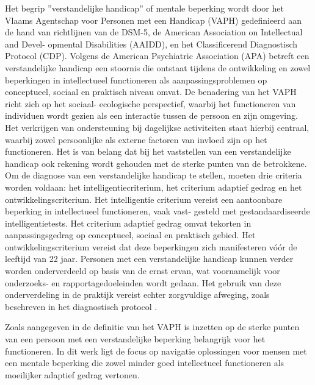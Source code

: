 Het begrip ”verstandelijke handicap” of mentale beperking wordt door het Vlaams Agentschap voor Personen met een Handicap (VAPH) gedefinieerd aan de hand van richtlijnen van de DSM-5, de American Association on Intellectual and Devel- opmental Disabilities (AAIDD), en het Classificerend Diagnostisch Protocol (CDP). Volgens de American Psychiatric Association (APA) betreft een verstandelijke handicap een stoornis die ontstaat tijdens de ontwikkeling en zowel beperkingen in intellectueel functioneren als aanpassingsproblemen op conceptueel, sociaal en praktisch niveau omvat. De benadering van het VAPH richt zich op het sociaal- ecologische perspectief, waarbij het functioneren van individuen wordt gezien als een interactie tussen de persoon en zijn omgeving. Het verkrijgen van ondersteuning bij dagelijkse activiteiten staat hierbij centraal, waarbij zowel persoonlijke als externe factoren van invloed zijn op het functioneren. Het is van belang dat bij het vaststellen van een verstandelijke handicap ook rekening wordt gehouden met de sterke punten van de betrokkene. Om de diagnose van een verstandelijke handicap te stellen, moeten drie criteria worden voldaan: het intelligentiecriterium, het criterium adaptief gedrag en het ontwikkelingscriterium. Het intelligentie criterium vereist een aantoonbare beperking in intellectueel functioneren, vaak vast- gesteld met gestandaardiseerde intelligentietests. Het criterium adaptief gedrag omvat tekorten in aanpassingsgedrag op conceptueel, sociaal en praktisch gebied. Het ontwikkelingscriterium vereist dat deze beperkingen zich manifesteren vóór de leeftijd van 22 jaar. Personen met een verstandelijke handicap kunnen verder worden onderverdeeld op basis van de ernst ervan, wat voornamelijk voor onderzoeks- en rapportagedoeleinden wordt gedaan. Het gebruik van deze onderverdeling in de praktijk vereist echter zorgvuldige afweging, zoals beschreven in het diagnostisch protocol \autocite{VAPH}.

Zoals aangegeven in de definitie van het VAPH is inzetten op de sterke punten van een persoon met een verstandelijke beperking belangrijk voor het functioneren. In dit werk ligt de focus op navigatie oplossingen voor mensen met een mentale beperking die zowel minder goed intellectueel functioneren als moeilijker adaptief gedrag vertonen. 

